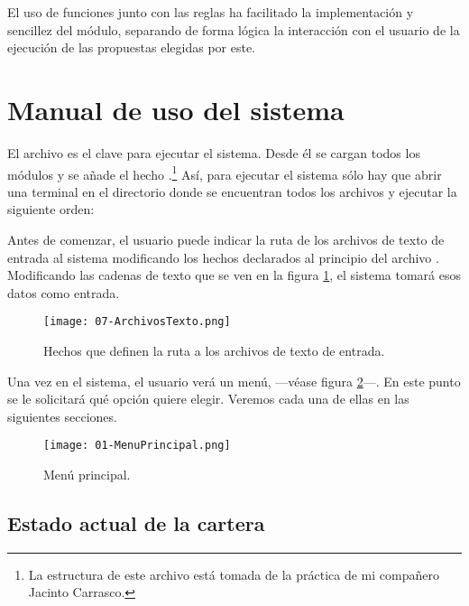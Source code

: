 \documentclass[a4paper, 11pt, titlepage]{article}
\begin{document}
    El uso de funciones junto con las reglas ha facilitado la implementación y sencillez del módulo, separando de forma lógica la interacción con el usuario de la ejecución de las propuestas elegidas por este.

    \section{Manual de uso del sistema}

    El archivo  es el clave para ejecutar el sistema. Desde él se cargan todos los módulos y se añade el hecho .\footnote{La estructura de este archivo está tomada de la práctica de mi compañero Jacinto Carrasco.} Así, para ejecutar el sistema sólo hay que abrir una terminal en el directorio donde se encuentran todos los archivos y ejecutar la siguiente orden:
    \begin{center}
    \end{center}

    Antes de comenzar, el usuario puede indicar la ruta de los archivos de texto de entrada al sistema modificando los hechos declarados al principio del archivo . Modificando las cadenas de texto que se ven en la figura \ref{fig:archivos}, el sistema tomará esos datos como entrada.
    \begin{center}
        \begin{figure}[!htb]
            \centering
            \texttt{[image: 07-ArchivosTexto.png]}
            \caption{Hechos que definen la ruta a los archivos de texto de entrada.}
            \label{fig:archivos}
        \end{figure}
    \end{center}
    Una vez en el sistema, el usuario verá un menú, ---véase figura \ref{fig:menu}---. En este punto se le solicitará qué opción quiere elegir. Veremos cada una de ellas en las siguientes secciones.
    \begin{center}
        \begin{figure}[!htb]
            \centering
            \texttt{[image: 01-MenuPrincipal.png]}
            \caption{Menú principal.}
            \label{fig:menu}
        \end{figure}
    \end{center}

    \subsection{Estado actual de la cartera}
\end{document}
